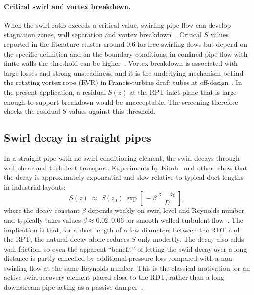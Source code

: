 \paragraph{Critical swirl and vortex breakdown.}
When the swirl ratio exceeds a critical value, swirling pipe flow can develop stagnation zones, wall separation and vortex breakdown~\cite{Rusak2014}. Critical $S$ values reported in the literature cluster around 0.6 for free swirling flows but depend on the specific definition and on the boundary conditions; in confined pipe flow with finite walls the threshold can be higher~\cite{Rusak2014}. Vortex breakdown is associated with large losses and strong unsteadiness, and it is the underlying mechanism behind the rotating vortex rope (RVR) in Francis-turbine draft tubes at off-design~\cite{Brekke2010}. In the present application, a residual $S(z)$ at the RPT inlet plane that is large enough to support breakdown would be unacceptable. The screening therefore checks the residual $S$ values against this threshold.
 
\subsection{Swirl decay in straight pipes}
\label{sec:theory_swirl_decay}
 
In a straight pipe with no swirl-conditioning element, the swirl decays through wall shear and turbulent transport. Experiments by Kitoh~\cite{Kitoh1991} and others show that the decay is approximately exponential and slow relative to typical duct lengths in industrial layouts:
\begin{equation}
S(z) \;\approx\; S(z_0)\,\exp\!\left[\,-\beta\,\frac{z - z_0}{D}\,\right],
\label{eq:S_decay}
\end{equation}
where the decay constant $\beta$ depends weakly on swirl level and Reynolds number and typically takes values $\beta \approx 0.02$--$0.06$ for smooth-walled turbulent flow~\cite{Kitoh1991, Beaubert2016}. The implication is that, for a duct length of a few diameters between the RDT and the RPT, the natural decay alone reduces $S$ only modestly. The decay also adds wall friction, so even the apparent ``benefit'' of letting the swirl decay over a long distance is partly cancelled by additional pressure loss compared with a non-swirling flow at the same Reynolds number. This is the classical motivation for an active swirl-recovery element placed close to the RDT, rather than a long downstream pipe acting as a passive damper~\cite{Andersen2014, Nguyen2024}.
 
